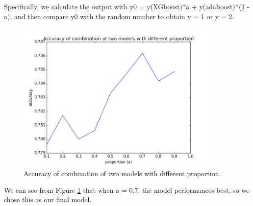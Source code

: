 \begin{itemize}
\begin{itemize}
    Specifically, we calculate the output with y0 = y(XGboost)*a + y(adaboost)*(1 - a), and then compare y0 with the random number to obtain y = 1 or y = 2.
    
     \begin{figure}[H]                           
    \centering
    \includegraphics[width=10cm]{combine.png}
    \caption{Accuracy of combination of two models with different proportion.}
    \label{com}
    \end{figure}
    We can see from Figure \ref{com} that when a = 0.7, the model performances best, so we chose this as our final model.

    \end{itemize}

\end{itemize}



